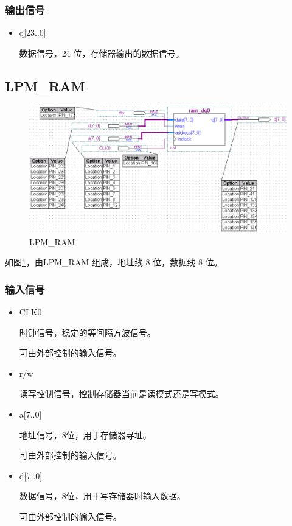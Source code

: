 \subsubsection{输出信号}

\begin{itemize}
    \item q[23..0]
    
    数据信号，24 位，存储器输出的数据信号。
    
\end{itemize}

\subsection{LPM\_RAM}

\begin{figure}[H]
\centering
\includegraphics[width=\textwidth]{images/prin2_2.png}
\caption{LPM\_RAM}
\label{fig:prin2_2}
\end{figure}

如图\ref{fig:prin2_2}，由LPM\_RAM 组成，地址线 8 位，数据线 8 位。

\subsubsection{输入信号}

\begin{itemize}
    \item CLK0
    
    时钟信号，稳定的等间隔方波信号。

    可由外部控制的输入信号。
    
    \item r/w
    
    读写控制信号，控制存储器当前是读模式还是写模式。
    
    \item a[7..0]
    
    地址信号，8位，用于存储器寻址。
    
    可由外部控制的输入信号。

    \item d[7..0]
    
    数据信号，8位，用于写存储器时输入数据。
    
    可由外部控制的输入信号。
    
\end{itemize} 

